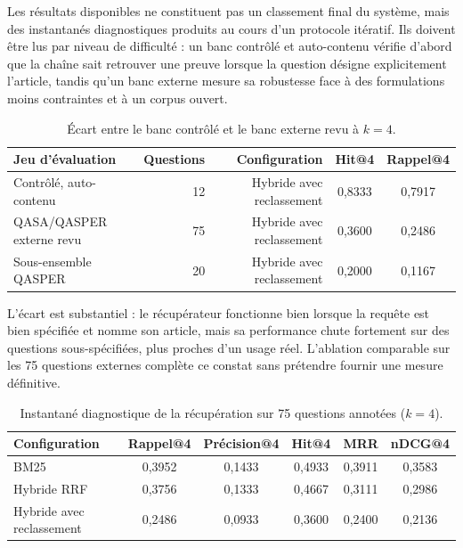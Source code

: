 Les résultats disponibles ne constituent pas un classement final du système, mais des
instantanés diagnostiques produits au cours d'un protocole itératif. Ils doivent être
lus par niveau de difficulté : un banc contrôlé et auto-contenu vérifie d'abord que
la chaîne sait retrouver une preuve lorsque la question désigne explicitement
l'article, tandis qu'un banc externe mesure sa robustesse face à des formulations
moins contraintes et à un corpus ouvert.

\begin{table}[ht]
\centering
\small
\caption{Écart entre le banc contrôlé et le banc externe revu à \(k=4\).}
\label{tab:retrieval-benchmark-gap}
\begin{tabular}{lrrcc}
\toprule
\textbf{Jeu d'évaluation} &
\textbf{Questions} &
\textbf{Configuration} &
\textbf{Hit@4} &
\textbf{Rappel@4} \\
\midrule
Contrôlé, auto-contenu
  & 12 & Hybride avec reclassement & 0,8333 & 0,7917 \\
QASA/QASPER externe revu
  & 75 & Hybride avec reclassement & 0,3600 & 0,2486 \\
Sous-ensemble QASPER
  & 20 & Hybride avec reclassement & 0,2000 & 0,1167 \\
\bottomrule
\end{tabular}
\end{table}

L'écart est substantiel : le récupérateur fonctionne bien lorsque la requête est
bien spécifiée et nomme son article, mais sa performance chute fortement sur des
questions sous-spécifiées, plus proches d'un usage réel. L'ablation comparable sur
les 75 questions externes complète ce constat sans prétendre fournir une mesure
définitive.

\begin{table}[ht]
\centering
\small
\caption{Instantané diagnostique de la récupération sur 75 questions annotées
(\(k=4\)).}
\label{tab:retrieval-current-results}
\begin{tabular}{lccccc}
\toprule
\textbf{Configuration} &
\textbf{Rappel@4} &
\textbf{Précision@4} &
\textbf{Hit@4} &
\textbf{MRR} &
\textbf{nDCG@4} \\
\midrule
BM25
  & 0,3952 & 0,1433 & 0,4933 & 0,3911 & 0,3583 \\
Hybride RRF
  & 0,3756 & 0,1333 & 0,4667 & 0,3111 & 0,2986 \\
Hybride avec reclassement
  & 0,2486 & 0,0933 & 0,3600 & 0,2400 & 0,2136 \\
\bottomrule
\end{tabular}
\end{table}


